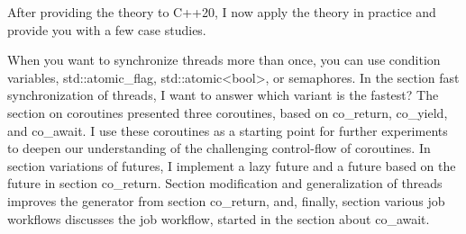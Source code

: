 
After providing the theory to C++20, I now apply the theory in practice and provide you with a few case studies.

When you want to synchronize threads more than once, you can use condition variables, std::atomic\_flag, std::atomic<bool>, or semaphores. In the section fast synchronization of threads, I want to answer which variant is the fastest? The section on coroutines presented three coroutines, based on co\_return, co\_yield, and co\_await. I use these coroutines as a starting point for further experiments to deepen our understanding of the challenging control-flow of coroutines. In section variations of futures, I implement a lazy future and a future based on the future in section co\_return. Section modification and generalization of threads improves the generator from section co\_return, and, finally, section various job workflows discusses the job workflow, started in the section about co\_await.


